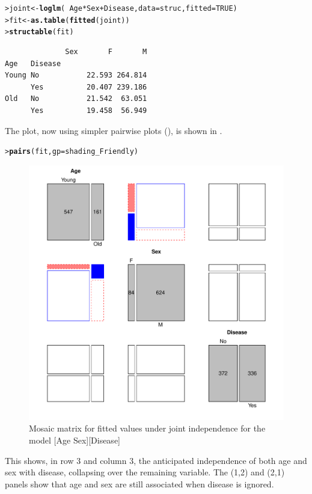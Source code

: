 \documentclass[10pt,krantz2]{krantz}\usepackage[]{graphicx}\usepackage[]{color}
\makeatletter
\newcommand{\hlnum}[1]{\textcolor[rgb]{0.686,0.059,0.569}{#1}}%
\newcommand{\hlopt}[1]{\textcolor[rgb]{0,0,0}{#1}}%
\newcommand{\hlstd}[1]{\textcolor[rgb]{0.345,0.345,0.345}{#1}}%
\newcommand{\hlkwb}[1]{\textcolor[rgb]{0.69,0.353,0.396}{#1}}%
\newcommand{\hlkwc}[1]{\textcolor[rgb]{0.333,0.667,0.333}{#1}}%
\newcommand{\hlkwd}[1]{\textcolor[rgb]{0.737,0.353,0.396}{\textbf{#1}}}%
\newenvironment{kframe}{%
 \def\at@end@of@kframe{}%
 \ifinner\ifhmode%
  \def\at@end@of@kframe{\end{minipage}}%
  \begin{minipage}{\columnwidth}%
 \fi\fi%
 \def\FrameCommand##1{\hskip\@totalleftmargin \hskip-\fboxsep
 \colorbox{shadecolor}{##1}\hskip-\fboxsep
     \hskip-\linewidth \hskip-\@totalleftmargin \hskip\columnwidth}%
 \MakeFramed {\advance\hsize-\width
   \@totalleftmargin\z@ \linewidth\hsize
   \@setminipage}}%
 {\par\unskip\endMakeFramed%
 \at@end@of@kframe}
\newenvironment{knitrout}{}{} %
\renewenvironment{knitrout}{\small\renewcommand{\baselinestretch}{.85}}{} %
\makeatother
\begin{document}
\begin{knitrout}
\color{fgcolor}\begin{kframe}
\begin{alltt}
\hlstd{> }\hlstd{joint} \hlkwb{<-} \hlkwd{loglm}\hlstd{(}\hlopt{~} \hlstd{Age} \hlopt{*} \hlstd{Sex} \hlopt{+} \hlstd{Disease,} \hlkwc{data} \hlstd{= struc,} \hlkwc{fitted} \hlstd{=} \hlnum{TRUE}\hlstd{)}
\hlstd{> }\hlstd{fit} \hlkwb{<-} \hlkwd{as.table}\hlstd{(}\hlkwd{fitted}\hlstd{(joint))}
\hlstd{> }\hlkwd{structable}\hlstd{(fit)}
\end{alltt}
\begin{verbatim}
              Sex       F       M
Age   Disease                    
Young No           22.593 264.814
      Yes          20.407 239.186
Old   No           21.542  63.051
      Yes          19.458  56.949
\end{verbatim}
\end{kframe}
\end{knitrout}

The  plot, now using simpler pairwise plots (),
is shown in .
\begin{knitrout}
\color{fgcolor}\begin{kframe}
\begin{alltt}
\hlstd{> }\hlkwd{pairs}\hlstd{(fit,} \hlkwc{gp} \hlstd{= shading_Friendly)}
\end{alltt}
\end{kframe}\begin{figure}[!htb]

\centerline{\includegraphics[width=.7\textwidth]{ch05/fig/struc-mos4-1} }

\caption[Mosaic matrix for fitted values under joint independence]{Mosaic matrix for fitted values under joint independence for the model [Age Sex][Disease]}\label{fig:struc-mos4}
\end{figure}


\end{knitrout}
This shows, in row 3 and column 3, the anticipated independence of both age and sex with
disease, collapsing over the remaining variable.
The (1,2) and (2,1) panels show that age and sex are still associated
when disease is ignored.
\end{document}
